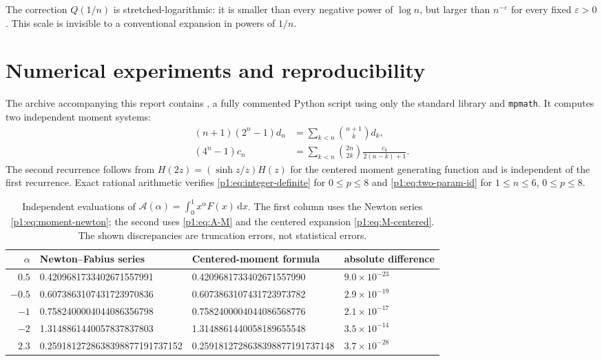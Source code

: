 \documentclass[11pt,oneside]{article}
\theoremstyle{definition}
\theoremstyle{remark}
\newcommand{\dd}{\,\mathrm d}
\newcommand{\eps}{\varepsilon}
\newcommand{\1}{\mathbf 1}
\begin{document}
The correction \(Q(1/n)\) is stretched-logarithmic: it is smaller than every
negative power of \(\log n\), but larger than \(n^{-\eps}\) for every fixed
\(\eps>0\).  This scale is invisible to a conventional expansion in powers of
\(1/n\).

\section{Numerical experiments and reproducibility}

The archive accompanying this report contains
, a fully commented Python script using only
the standard library and \texttt{mpmath}.  It computes two independent moment
systems:
\begin{align}
 (n+1)(2^n-1)d_n&=\sum_{k<n}\binom{n+1}{k}d_k,                 \label{p1:eq:num-d}\\
 (4^n-1)c_n&=\sum_{k<n}\binom{2n}{2k}\frac{c_k}{2(n-k)+1}.     \label{p1:eq:num-c}
\end{align}
The second recurrence follows from
\(H(2z)=(\sinh z/z)H(z)\) for the centered moment generating function and is
independent of the first recurrence.  Exact rational arithmetic verifies
\eqref{p1:eq:integer-definite} for \(0\leq p\leq8\) and
\eqref{p1:eq:two-param-id} for \(1\leq n\leq6\), \(0\leq p\leq8\).

\begin{table}[htbp]
\centering
\small
\caption{Independent evaluations of
\(\mathcal A(\alpha)=\int_0^1x^\alpha F(x)\dd x\).  The first column uses the
Newton series \eqref{p1:eq:moment-newton}; the second uses
\eqref{p1:eq:A-M} and the centered expansion \eqref{p1:eq:M-centered}.  The shown
discrepancies are truncation errors, not statistical errors.}
\label{p1:tab:fractional-checks}
\begin{tabular}{@{}rlll@{}}
\toprule
\(\alpha\)&Newton--Fabius series&Centered-moment formula&absolute difference\\
\midrule
\(0.5\)&0.4209681733402671557991&0.4209681733402671557990&\(9.0\times10^{-23}\)\\
\(-0.5\)&0.6073863107431723970836&0.6073863107431723973782&\(2.9\times10^{-19}\)\\
\(-1\)&0.7582400004044086356798&0.7582400004044086568776&\(2.1\times10^{-17}\)\\
\(-2\)&1.3148861440057837837803&1.3148861440058189655548&\(3.5\times10^{-14}\)\\
\(2.3\)&0.2591812728638398877191737152&0.2591812728638398877191737148&\(3.7\times10^{-28}\)\\
\bottomrule
\end{tabular}
\end{table}
\end{document}
